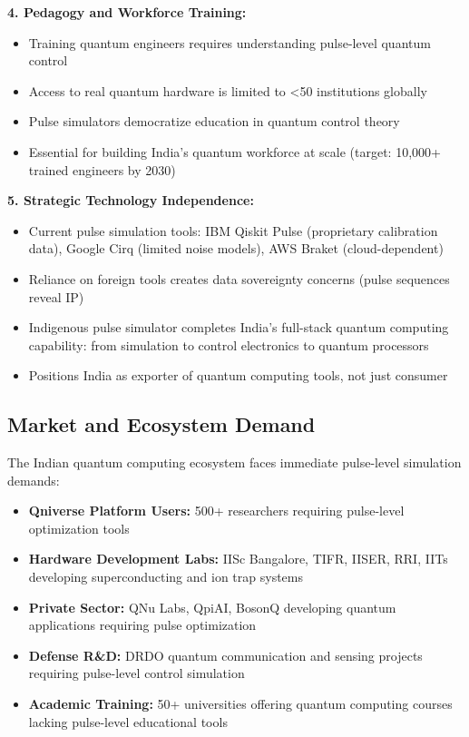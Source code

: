 \documentclass[12pt,a4paper]{article}
\begin{document}
\textbf{4. Pedagogy and Workforce Training:}
\begin{itemize}[noitemsep]
\item Training quantum engineers requires understanding pulse-level quantum control
\item Access to real quantum hardware is limited to <50 institutions globally
\item Pulse simulators democratize education in quantum control theory
\item Essential for building India's quantum workforce at scale (target: 10,000+ trained engineers by 2030)
\end{itemize}

\textbf{5. Strategic Technology Independence:}
\begin{itemize}[noitemsep]
\item Current pulse simulation tools: IBM Qiskit Pulse (proprietary calibration data), Google Cirq (limited noise models), AWS Braket (cloud-dependent)
\item Reliance on foreign tools creates data sovereignty concerns (pulse sequences reveal IP)
\item Indigenous pulse simulator completes India's full-stack quantum computing capability: from simulation to control electronics to quantum processors
\item Positions India as exporter of quantum computing tools, not just consumer
\end{itemize}

\subsection{Market and Ecosystem Demand}

The Indian quantum computing ecosystem faces immediate pulse-level simulation demands:

\begin{itemize}[noitemsep]
\item \textbf{Qniverse Platform Users:} 500+ researchers requiring pulse-level optimization tools
\item \textbf{Hardware Development Labs:} IISc Bangalore, TIFR, IISER, RRI, IITs developing superconducting and ion trap systems
\item \textbf{Private Sector:} QNu Labs, QpiAI, BosonQ developing quantum applications requiring pulse optimization
\item \textbf{Defense R\&D:} DRDO quantum communication and sensing projects requiring pulse-level control simulation
\item \textbf{Academic Training:} 50+ universities offering quantum computing courses lacking pulse-level educational tools
\end{itemize}
\end{document}
